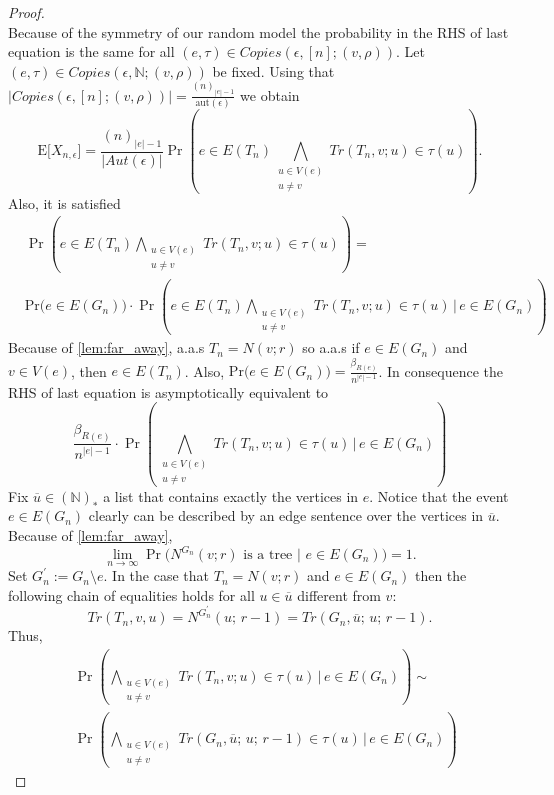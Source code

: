 \documentclass[12pt,notitlepage,a4paper]{article}
\theoremstyle{definition}
\newcommand{\N}{\mathbb{N}}
\newcommand{\Ln}{\lim\limits_{n\to \infty}}
\newcommand{\PR}[1]{\mathrm{Pr}\big(#1\big)}
\newcommand{\aut}{\mathrm{aut}}
\begin{document}
\begin{proof}
\[		\]
		Because of the symmetry of our random model the probability 
		in the RHS of last equation is the same for all 
		$(e,\tau)\in Copies(\epsilon,[n];(v,\rho))$. Let
		$(e,\tau)\in Copies(\epsilon,\N;(v,\rho))$ be fixed. 
		Using that 
		$|Copies(\epsilon,[n];(v,\rho))|=\frac{(n)_{|e|-1}}
		{\aut(\epsilon)}$ we obtain
		\[
		\mathrm{E}\big[ X_{n,\epsilon} \big]
		=
		\frac{(n)_{|e|-1}}{|
			Aut(\epsilon)|} \Pr
		\left(e\in E(T_{n})
		\bigwedge_{\substack{u\in V(e)\\ u\neq v} } 
		Tr(T_n, v; u)\in \tau(u) \right).
		\]
		Also, it is satisfied
		\begin{align*}
		&\Pr
		\left( e\in E(T_{n})
		\bigwedge_{\substack{u\in V(e)\\ u\neq v} } Tr(T_n, v; u)\in 
		\tau(u) \right)=\\
		&\PR{ e\in E(G_n)} \cdot
		\Pr
		\left( e\in E(T_{n})
		\bigwedge_{\substack{u\in V(e)\\ u\neq v} } 
		Tr(T_{n}, v; u)\in \tau(u) \, \Bigg| \,  e\in E(G_n) \right)
		\end{align*}
		Because of \cref{lem:far_away}, a.a.s $T_n=N(v;r)$ so a.a.s if
		$e\in E(G_n)$
		and $v\in V(e)$, then $e\in E(T_n)$. Also,
		$\PR{e\in E(G_n)}=\frac{\beta_{R(e)}}{n^{|e|-1}}$. In consequence
		the RHS of last equation is asymptotically equivalent
		to
		\[
		\frac{\beta_{R(e)}}{n^{|e|-1}} \cdot
		\Pr	\left(
		\bigwedge_{\substack{u\in V(e)\\ u\neq v} } Tr(T_{n}, v; u)\in \tau(u) \, \Bigg| \,  e\in E(G_n) \right)
		\]
		Fix $\overline{u}\in (\N)_*$ a list that contains exactly the vertices
		in $e$. Notice that the event $e\in E(G_n)$ clearly can be described
		by an edge sentence
		over the vertices in $\overline{u}$.
		Because of \cref{lem:far_away},
		\[
		\Ln \Pr\Big(
		N^{G_n}(v;r) \text{ is a tree } \Big| \, \, e\in E(G_n) \Big)=1.
		\] 
		Set $G^\prime_n:=G_n \setminus e$.
		In the case that $T_n= N(v;r)$ and $e\in E(G_n)$ then
		the following chain of equalities holds for all 
		$u\in \overline{u}$ different from $v$:
		\[
		Tr(T_{n}, v, u)=N^{G^\prime_n}(u;\,r-1)=Tr(G_n,\overline{u};\, u;\, r-1).
		\] 
		Thus,
		\begin{align}
		\nonumber
		&\Pr	\left(
		\bigwedge_{\substack{u\in V(e)\\ u\neq v} } Tr(T_{n}, v; u)\in \tau(u) 
		\, \Bigg| \,  e\in E(G_n) \right)
		\sim\\ \label{eqn:equaltrees}
		&
		\Pr \left(
		\bigwedge_{\substack{u\in V(e)\\ u\neq v} }
		Tr(G_n,\overline{u};\, u;\, r-1)
		\in \tau(u) \, \Bigg| \,  e\in E(G_n) \right)
		\end{align}
	

\end{proof}
\end{document}
